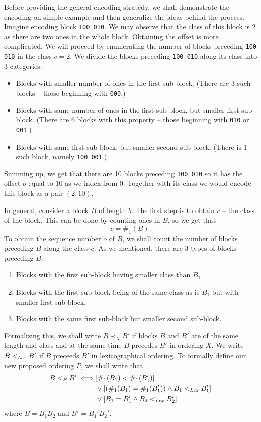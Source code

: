 Before providing the general encoding stratedy, we shall demonstrate the encoding on
simple example and then generalize the ideas behind the process. Imagine encoding
block {\tt 100 010}. We may observe that the class of this block is 2 as there are two ones in
the whole block. Obtaining the offset is more complicated. We will proceed by enumerating the
number of blocks preceding {\tt 100 010} in the class $c=2$. We divide the blocks preceding
{\tt 100 010} along its class into 3 categories:

\begin{itemize}
    \item Blocks with smaller number of ones in the first sub-block.
    (There are 3 such blocks -- those beginning with {\tt 000}.)
    \item Blocks with same number of ones in the first sub-block, but smaller first sub-block.
    (There are 6 blocks with this property -- those beginning with {\tt 010} or {\tt 001}.)
    \item Blocks with same first sub-block, but smaller second sub-block.
    (There is 1 such block, namely {\tt 100 001}.)
\end{itemize}

Summing up, we get that there are 10 blocks preceding {\tt 100 010} so it has the offset $o$
equal to 10 as we index from 0. Together with its class we would encode this block as a pair
$(2, 10)$.

In general, consider a block $B$ of length $b$. The first step is to obtain
$c$ -- the class of the block. This can be done by counting ones in $B$, so we
get that $$c=\#_1(B).$$ To obtain the sequence number $o$ of $B$, we shall
count the number of blocks preceding $B$ along the class $c$. As we mentioned,
there are 3 types of blocks preceding $B$:

\begin{enumerate}
    \item Blocks with the first sub-block having smaller class than $B_1$.
    \label{chapter3:encoding:1}
    \item Blocks with the first sub-block being of the same class as is $B_1$
    but with smaller first sub-block. \label{chapter3:encoding:2}
    \item Blocks with the same first sub-block but smaller second sub-block.
    \label{chapter3:encoding:3}
\end{enumerate}

Formalizing this, we shall write $B\prec_X B'$ if blocks $B$ and $B'$ are of
the same length and class and at the same time $B$ precedes $B'$ in ordering $X$.
We write $B<_{\mathit{Lex}} B'$ if $B$ preceeds $B'$ in lexicographical
ordering. To formally define our new proposed ordering $P$, we shall write that
\begin{align*}
    B<_P B' \iff
    &[\#_1(B_1) < \#_1(B_1')] \\
    &\lor [(\#_1(B_1) = \#_1(B_1')) \land B_1 <_{\mathit{Lex}} B_1']\\
    &\lor [B_1 = B_1' \land B_2 <_{\mathit{Lex}} B_2']
\end{align*}
where $B=B_1B_2$ and $B'=B_1'B_2'$.

